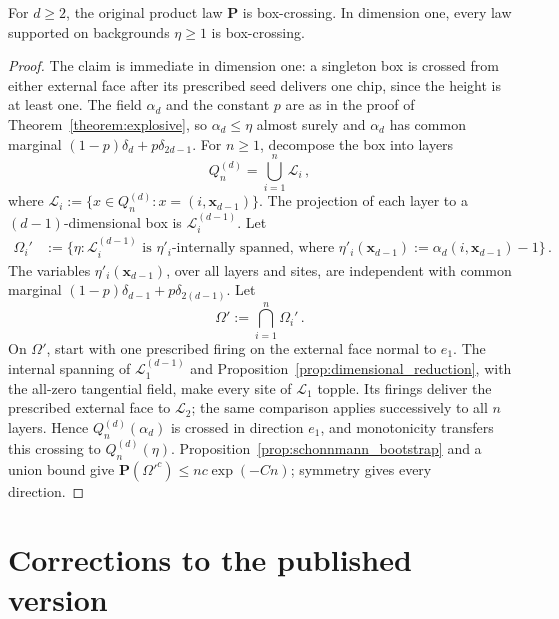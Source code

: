 \documentclass[12pt]{amsart}
\begin{document}
\begin{prop} \label{prop:box_crossing}
    For $d\geq2$, the original product law $\mathbf P$ is box-crossing. In dimension one, every law supported on backgrounds $\eta\geq1$ is box-crossing.
\end{prop}
\begin{proof}
	The claim is immediate in dimension one: a singleton box is crossed from either external face after its prescribed seed delivers one chip, since the height is at least one.
The field $\alpha_d$ and the constant $p$ are as in the proof of Theorem~\ref{theorem:explosive}, so $\alpha_d\leq\eta$ almost surely and $\alpha_d$ has common marginal $(1-p)\delta_d+p\delta_{2d-1}$. For $n\geq1$, decompose the box into layers
\begin{equation*}
Q_n^{(d)} = \bigcup_{i=1}^{n} \mathcal{L}_i\,,
\end{equation*}
where $\mathcal{L}_i := \{ x \in Q_n^{(d)} : x = (i, \mathbf{x}_{d-1})\}$. The projection of each layer to a $(d-1)$-dimensional box is $\mathcal{L}_i^{(d-1)}$. Let
\begin{align*}
\Omega_i' &:= \{\eta : \mbox{$\mathcal{L}_i^{(d-1)}$ is $\eta'_i$-internally spanned, where $\eta'_i(\mathbf{x}_{d-1}) := \alpha_d(i,\mathbf{x}_{d-1}) - 1$} \}\,.
\end{align*}
The variables $\eta'_i(\mathbf{x}_{d-1})$, over all layers and sites, are independent with common marginal $(1-p)\delta_{d-1}+p\delta_{2(d-1)}$. Let
\begin{equation*}
\Omega'  := \bigcap_{i=1}^n \Omega_i'\,.
\end{equation*}
On $\Omega'$, start with one prescribed firing on the external face normal to $e_1$. The internal spanning of $\mathcal L_1^{(d-1)}$ and Proposition~\ref{prop:dimensional_reduction}, with the all-zero tangential field, make every site of $\mathcal L_1$ topple. Its firings deliver the prescribed external face to $\mathcal L_2$; the same comparison applies successively to all $n$ layers. Hence $Q_n^{(d)}(\alpha_d)$ is crossed in direction $e_1$, and monotonicity transfers this crossing to $Q_n^{(d)}(\eta)$.
Proposition~\ref{prop:schonnmann_bootstrap} and a union bound give $\mathbf P(\Omega'^c)\leq n c\exp(-Cn)$; symmetry gives every direction.
	
\end{proof}

\section*{Corrections to the published version}
\end{document}
